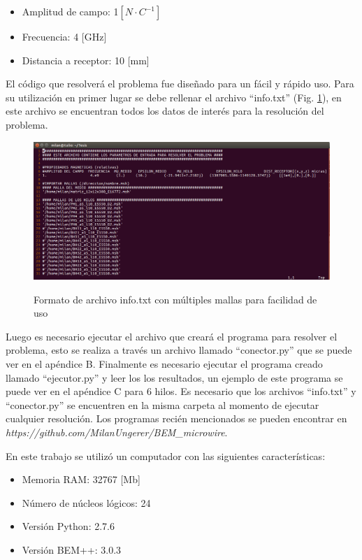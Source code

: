 \documentclass[12pt,letterpaper]{article}
\numberwithin{equation}{section}
\begin{document}
\begin{itemize}
	\item Amplitud de campo: 1$[N\cdot C^{-1}]$
	\item Frecuencia: 4 [GHz]
	\item Distancia a receptor: 10 [mm]
\end{itemize}

El código que resolverá el problema fue diseñado para un fácil y rápido uso. Para su utilización en primer lugar se debe rellenar el archivo ``info.txt'' (Fig. \ref{fig:infotxt}), en este archivo se encuentran todos los datos de interés para la resolución del problema.

\begin{figure}[H]
	\centering\includegraphics[scale=0.42]{Imagenes/infotxt.png}\\
	\caption{Formato de archivo info.txt con múltiples mallas para facilidad de uso}
	\label{fig:infotxt}
\end{figure} 

\pagebreak
Luego es necesario ejecutar el archivo que creará el programa para resolver el problema, esto se realiza a través un archivo llamado ``conector.py'' que se puede ver en el apéndice B. Finalmente es necesario ejecutar el programa creado llamado ``ejecutor.py'' y leer los los resultados, un ejemplo de este programa se puede ver en el apéndice C para 6 hilos. Es necesario que los archivos ``info.txt'' y ``conector.py'' se encuentren en la misma carpeta al momento de ejecutar cualquier resolución. Los programas recién mencionados se pueden encontrar en \textit{https://github.com/MilanUngerer/BEM\_microwire}.

En este trabajo se utilizó un computador con las siguientes características:
\begin{itemize}
	\item Memoria RAM: 32767 [Mb]
	\item Número de núcleos lógicos: 24
	\item Versión Python: 2.7.6
	\item Versión BEM++: 3.0.3
\end{itemize}
\end{document}
